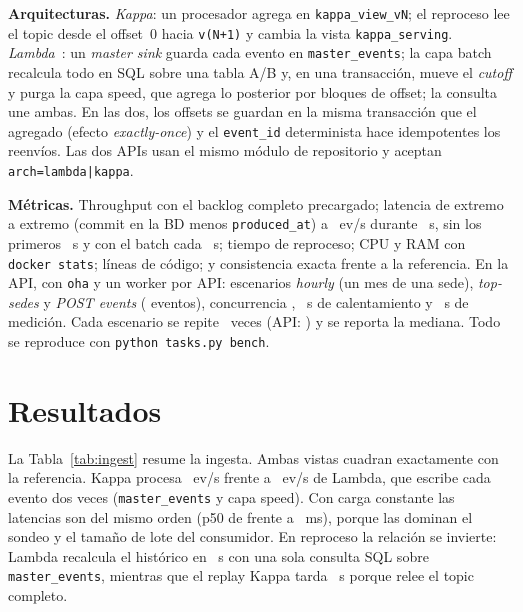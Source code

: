 \documentclass[conference,a4paper]{IEEEtran}
\begin{document}
\textbf{Arquitecturas.} \emph{Kappa}: un procesador agrega en \texttt{kappa\_view\_vN}; el reproceso
lee el topic desde el offset~0 hacia \texttt{v(N+1)} y cambia la vista \texttt{kappa\_serving}.
\emph{Lambda}~\cite{kiran2015}: un \emph{master sink} guarda cada evento en \texttt{master\_events};
la capa batch recalcula todo en SQL sobre una tabla A/B y, en una transacción, mueve el
\emph{cutoff} y purga la capa speed, que agrega lo posterior por bloques de offset; la consulta une
ambas. En las dos, los offsets se guardan en la misma transacción que el agregado (efecto
\emph{exactly-once}) y el \texttt{event\_id} determinista hace idempotentes los reenvíos. Las dos APIs
usan el mismo módulo de repositorio y aceptan \texttt{arch=lambda|kappa}.

\textbf{Métricas.} Throughput con el backlog completo precargado; latencia de extremo a extremo
(commit en la BD menos \texttt{produced\_at}) a \NumRate{}~ev/s durante \NumLatSeconds{}~s, sin los
primeros \NumWarmup{}~s y con el batch cada \NumBatchEvery{}~s; tiempo de reproceso; CPU y RAM con
\texttt{docker stats}; líneas de código; y consistencia exacta frente a la referencia. En la API, con
\texttt{oha} y un worker por API: escenarios \emph{hourly} (un mes de una sede), \emph{top-sedes} y
\emph{POST events} (\NumPostEvents{} eventos), concurrencia \NumApiConc, \NumApiWarmup{}~s de
calentamiento y \NumApiSeconds{}~s de medición. Cada escenario se repite \NumReps{}~veces (API:
\NumApiReps) y se reporta la mediana. Todo se reproduce con \texttt{python tasks.py bench}.

\section{Resultados}
La Tabla~\ref{tab:ingest} resume la ingesta. Ambas vistas cuadran exactamente con la referencia.
Kappa procesa \NumTpKappa{}~ev/s frente a \NumTpLambda{}~ev/s de Lambda, que escribe cada evento dos
veces (\texttt{master\_events} y capa speed). Con carga constante las latencias son del mismo orden
(p50 de \NumPfiftyKappa{} frente a \NumPfiftyLambda{}~ms), porque las dominan el sondeo y el tamaño
de lote del consumidor. En reproceso la relación se invierte: Lambda recalcula el histórico en
\NumRpLambda{}~s con una sola consulta SQL sobre \texttt{master\_events}, mientras que el replay
Kappa tarda \NumRpKappa{}~s porque relee el topic completo.

\begin{table}[!t]
\centering\caption{Ingesta (mediana de \NumReps{} repeticiones)}\label{tab:ingest}
\footnotesize
\end{table}
\end{document}
